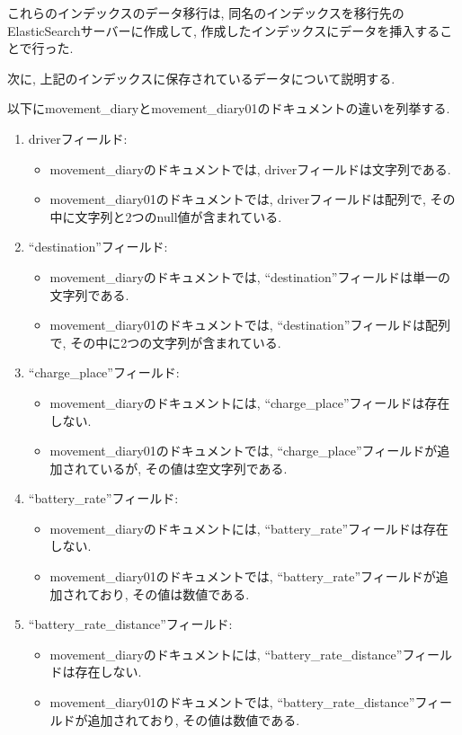 これらのインデックスのデータ移行は, 同名のインデックスを移行先のElasticSearchサーバーに作成して, 作成したインデックスにデータを挿入することで行った.

次に, 上記のインデックスに保存されているデータについて説明する.

以下にmovement\_diaryとmovement\_diary01のドキュメントの違いを列挙する.

\begin{enumerate}
  \item driverフィールド:
        \begin{itemize}
          \item movement\_diaryのドキュメントでは, driverフィールドは文字列である.
          \item movement\_diary01のドキュメントでは, driverフィールドは配列で, その中に文字列と2つのnull値が含まれている.
        \end{itemize}
        
  \item ``destination''フィールド:
        \begin{itemize}
          \item movement\_diaryのドキュメントでは, ``destination''フィールドは単一の文字列である.
          \item movement\_diary01のドキュメントでは, ``destination''フィールドは配列で, その中に2つの文字列が含まれている.
        \end{itemize}
        
  \item ``charge\_place''フィールド:
        \begin{itemize}
          \item movement\_diaryのドキュメントには, ``charge\_place''フィールドは存在しない.
          \item movement\_diary01のドキュメントでは, ``charge\_place''フィールドが追加されているが, その値は空文字列である.
        \end{itemize}
        
  \item ``battery\_rate''フィールド:
        \begin{itemize}
          \item movement\_diaryのドキュメントには, ``battery\_rate''フィールドは存在しない.
          \item movement\_diary01のドキュメントでは, ``battery\_rate''フィールドが追加されており, その値は数値である.
        \end{itemize}
        
  \item ``battery\_rate\_distance''フィールド:
        \begin{itemize}
          \item movement\_diaryのドキュメントには, ``battery\_rate\_distance''フィールドは存在しない.
          \item movement\_diary01のドキュメントでは, ``battery\_rate\_distance''フィールドが追加されており, その値は数値である.
        \end{itemize}
\end{enumerate}

